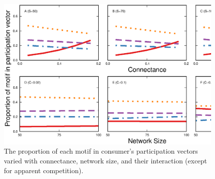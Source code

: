 \documentclass[12pt]{article}
\begin{document}
\begin{spacing}{2.0}
    \begin{figure}[ht!]
        \centering
        \includegraphics[width=\textwidth]{figures/roles_vs_SC_all.eps}
        \caption{The proportion of each motif in consumer's participation vectors varied with connectance, network size, and their interaction (except for apparent competition).}
        \label{fig:motifs_vs_TL_and_deg}
    \end{figure}    


\end{spacing}
\end{document}
